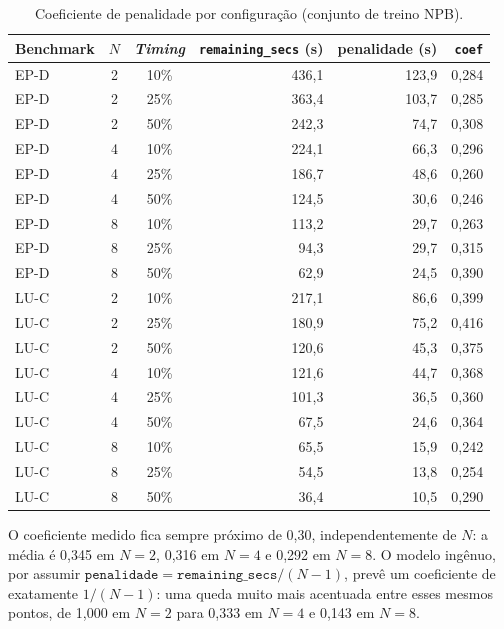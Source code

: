 \begin{table}[htb]
  \caption{Coeficiente de penalidade por configuração (conjunto de treino NPB).}
  \label{tab:adaptive-coef}
  \centering
  \small
  \begin{tabular}{l c c r r r}
    \toprule
    Benchmark & $N$ & \textit{Timing} & \texttt{remaining\_secs} (s) & penalidade (s) & \texttt{coef} \\
    \midrule
    EP-D & 2 & 10\% & 436,1 & 123,9 & 0,284 \\
    EP-D & 2 & 25\% & 363,4 & 103,7 & 0,285 \\
    EP-D & 2 & 50\% & 242,3 & 74,7  & 0,308 \\
    EP-D & 4 & 10\% & 224,1 & 66,3  & 0,296 \\
    EP-D & 4 & 25\% & 186,7 & 48,6  & 0,260 \\
    EP-D & 4 & 50\% & 124,5 & 30,6  & 0,246 \\
    EP-D & 8 & 10\% & 113,2 & 29,7  & 0,263 \\
    EP-D & 8 & 25\% & 94,3  & 29,7  & 0,315 \\
    EP-D & 8 & 50\% & 62,9  & 24,5  & 0,390 \\
    \addlinespace
    LU-C & 2 & 10\% & 217,1 & 86,6  & 0,399 \\
    LU-C & 2 & 25\% & 180,9 & 75,2  & 0,416 \\
    LU-C & 2 & 50\% & 120,6 & 45,3  & 0,375 \\
    LU-C & 4 & 10\% & 121,6 & 44,7  & 0,368 \\
    LU-C & 4 & 25\% & 101,3 & 36,5  & 0,360 \\
    LU-C & 4 & 50\% & 67,5  & 24,6  & 0,364 \\
    LU-C & 8 & 10\% & 65,5  & 15,9  & 0,242 \\
    LU-C & 8 & 25\% & 54,5  & 13,8  & 0,254 \\
    LU-C & 8 & 50\% & 36,4  & 10,5  & 0,290 \\
    \bottomrule
  \end{tabular}
\end{table}

O coeficiente medido fica sempre próximo de 0,30, independentemente de $N$: a média é
0,345 em $N=2$, 0,316 em $N=4$ e 0,292 em $N=8$. O modelo ingênuo, por assumir
$\texttt{penalidade} = \texttt{remaining\_secs}/(N-1)$, prevê um coeficiente de
exatamente $1/(N-1)$: uma queda muito mais acentuada entre esses mesmos pontos, de
1,000 em $N=2$ para 0,333 em $N=4$ e 0,143 em $N=8$.

